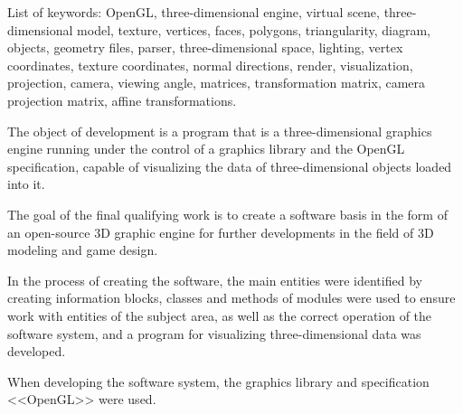 List of keywords: OpenGL, three-dimensional engine, virtual scene, three-dimensional model, texture, vertices, faces, polygons, triangularity, diagram, objects, geometry files, parser, three-dimensional space, lighting, vertex coordinates, texture coordinates, normal directions, render, visualization, projection, camera, viewing angle, matrices, transformation matrix, camera projection matrix, affine transformations.

The object of development is a program that is a three-dimensional graphics engine running under the control of a graphics library and the OpenGL specification, capable of visualizing the data of three-dimensional objects loaded into it.

The goal of the final qualifying work is to create a software basis in the form of an open-source 3D graphic engine for further developments in the field of 3D modeling and game design.

In the process of creating the software, the main entities were identified by creating information blocks, classes and methods of modules were used to ensure work with entities of the subject area, as well as the correct operation of the software system, and a program for visualizing three-dimensional data was developed.

When developing the software system, the graphics library and specification <<OpenGL>> were used.

